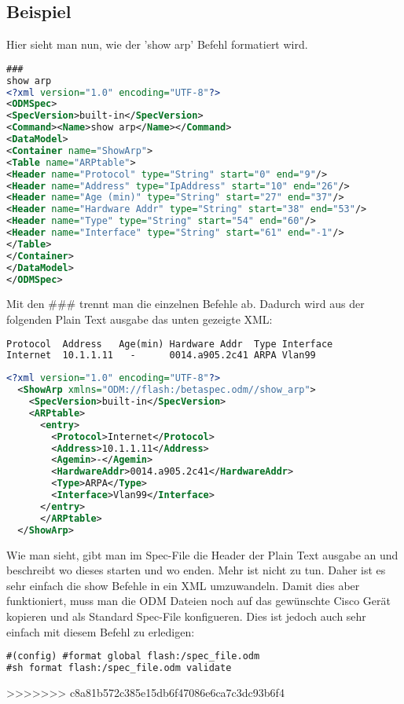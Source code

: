 \documentclass[a4,12pt]{scrartcl}
\begin{document}
\subsection{Beispiel}
Hier sieht man nun, wie der 'show arp' Befehl formatiert wird.\newline
\begin{lstlisting}[language=xml]
###
show arp
<?xml version="1.0" encoding="UTF-8"?>
<ODMSpec>
<SpecVersion>built-in</SpecVersion>
<Command><Name>show arp</Name></Command>
<DataModel>
<Container name="ShowArp">
<Table name="ARPtable">
<Header name="Protocol" type="String" start="0" end="9"/>
<Header name="Address" type="IpAddress" start="10" end="26"/>
<Header name="Age (min)" type="String" start="27" end="37"/>
<Header name="Hardware Addr" type="String" start="38" end="53"/>
<Header name="Type" type="String" start="54" end="60"/>
<Header name="Interface" type="String" start="61" end="-1"/>
</Table>
</Container>
</DataModel>
</ODMSpec>
\end{lstlisting}
Mit den \#\#\# trennt man die einzelnen Befehle ab.\newline\newline
Dadurch wird aus der folgenden Plain Text ausgabe das unten gezeigte XML:\newline
\begin{lstlisting}[language=xml]
Protocol  Address   Age(min) Hardware Addr  Type Interface
Internet  10.1.1.11   -      0014.a905.2c41 ARPA Vlan99
\end{lstlisting}
\begin{lstlisting}[language=xml]
<?xml version="1.0" encoding="UTF-8"?>
  <ShowArp xmlns="ODM://flash:/betaspec.odm//show_arp">
    <SpecVersion>built-in</SpecVersion>
    <ARPtable>
      <entry>
        <Protocol>Internet</Protocol>
        <Address>10.1.1.11</Address>
        <Agemin>-</Agemin>
        <HardwareAddr>0014.a905.2c41</HardwareAddr>
        <Type>ARPA</Type>
        <Interface>Vlan99</Interface>
      </entry>
      </ARPtable>
  </ShowArp>
\end{lstlisting}

Wie man sieht, gibt man im Spec-File die Header der Plain Text ausgabe an und beschreibt wo dieses starten und wo enden. Mehr ist nicht zu tun. Daher ist es sehr einfach die show Befehle in ein XML umzuwandeln.\newline
Damit dies aber funktioniert, muss man die ODM Dateien noch auf das gewünschte Cisco Gerät kopieren und als Standard Spec-File konfigueren. Dies ist jedoch auch sehr einfach mit diesem Befehl zu erledigen:\newline
\begin{lstlisting}[language=xml]
#(config) #format global flash:/spec_file.odm
#sh format flash:/spec_file.odm validate
\end{lstlisting}
>>>>>>> c8a81b572c385e15db6f47086e6ca7c3dc93b6f4
\newpage
\end{document}
